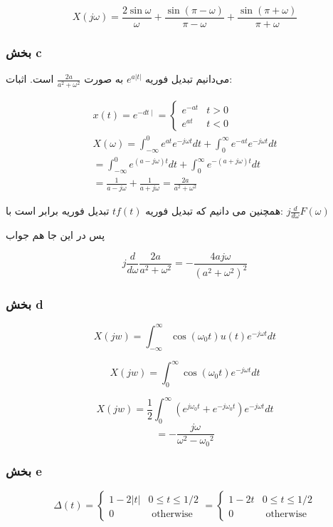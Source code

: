 \documentclass[12pt]{article}
\begin{document}
$$\boxed{X(j\omega) = \frac{2 \sin \omega}{\omega}+\frac{\sin (\pi-\omega)}{\pi-\omega}+\frac{\sin (\pi+\omega)}{\pi+\omega}}$$

\subsubsection{بخش c}


می‌دانیم تبدیل فوریه $e^{a|t|}$ به صورت
$\frac{2a}{a^2 + \omega^2}$
است.
اثبات:

$$
\begin{gathered}
	x(t)=e^{-d t \mid}=\left\{\begin{array}{ll}
		e^{-a t} & t>0 \\
		e^{a t} & t<0
	\end{array}\right. \\
	X(\omega)=\int_{-\infty}^{0} e^{a t} e^{-j \omega t} d t+\int_{0}^{\infty} e^{-a t} e^{-j \omega t} d t \\
	=\int_{-\infty}^{0} e^{(a-j \omega) t} d t+\int_{0}^{\infty} e^{-(a+j \omega) t} d t \\
	=\frac{1}{a-j \omega}+\frac{1}{a+j \omega}=\frac{2 a}{a^{2}+\omega^{2}}
\end{gathered}
$$

همچنین می دانیم که تبدیل فوریه
$t f(t)$
تبدیل فوریه برابر است با:
$j \frac{d}{d\omega} F(\omega)$

پس در این جا هم جواب

$$j \frac{d}{d \omega } \frac{2a}{a^2 + \omega^2} = -\frac{4 a  j \omega}{\left(a^2+\omega^2\right)^2}$$


\subsubsection{بخش d}

$$X(jw) = \int_{-\infty}^{\infty} \cos (\omega_0 t) u(t) e^{-j \omega t} dt$$

$$X(jw) = \int_{0}^{\infty} \cos (\omega_0 t) e^{-j \omega t} dt$$

$$X(jw) = \frac{1}{2} \int_{0}^{\infty} (e^{j \omega_0 t} + e^{-j \omega_0 t}) e^{-j \omega t} dt$$
$$= -\frac{j \omega}{\omega^2-{\omega_0}^2}$$


\subsubsection{بخش e}

$$
\Delta(t)=\left\{\begin{array}{lr}
	1-2|t| & 0 \leq t \leq 1 / 2 \\
	0 & \text { otherwise }
\end{array}\right. = 
\left\{\begin{array}{lr}
	1-2t & 0 \leq t \leq 1 / 2 \\
	0 & \text { otherwise }
\end{array}\right.
$$
\end{document}
